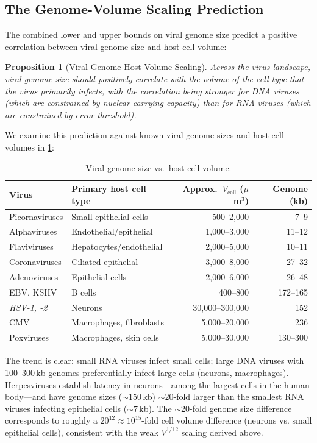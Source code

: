 \documentclass[11pt,twocolumn,a4paper]{article}
\newtheorem{proposition}[theorem]{Proposition}
\theoremstyle{definition}
\theoremstyle{remark}
\begin{document}
\subsection{The Genome-Volume Scaling Prediction}

The combined lower and upper bounds on viral genome size predict a positive correlation between viral genome size and host cell volume:

\begin{proposition}[Viral Genome-Host Volume Scaling]
\label{prop:genome_volume}
Across the virus landscape, viral genome size should positively correlate with the volume of the cell type that the virus primarily infects, with the correlation being stronger for DNA viruses (which are constrained by nuclear carrying capacity) than for RNA viruses (which are constrained by error threshold).
\end{proposition}

We examine this prediction against known viral genome sizes and host cell volumes in \cref{tab:genome_scaling}:

\begin{table}[h]
\centering
\caption{Viral genome size vs.\ host cell volume.}
\label{tab:genome_scaling}
\begin{tabular}{p{3.2cm}lrr}
\toprule
Virus & Primary host cell type & Approx.\ $V_{\mathrm{cell}}$ ($\mu$m$^3$) & Genome (kb) \\
\midrule
Picornaviruses & Small epithelial cells & 500--2,000 & 7--9 \\
Alphaviruses & Endothelial/epithelial & 1,000--3,000 & 11--12 \\
Flaviviruses & Hepatocytes/endothelial & 2,000--5,000 & 10--11 \\
Coronaviruses & Ciliated epithelial & 3,000--8,000 & 27--32 \\
Adenoviruses & Epithelial cells & 2,000--6,000 & 26--48 \\
EBV, KSHV & B cells & 400--800 & 172--165 \\
\textit{HSV-1, -2} & Neurons & 30,000--300,000 & 152 \\
CMV & Macrophages, fibroblasts & 5,000--20,000 & 236 \\
Poxviruses & Macrophages, skin cells & 5,000--30,000 & 130--300 \\
\bottomrule
\end{tabular}
\end{table}

The trend is clear: small RNA viruses infect small cells; large DNA viruses with 100--300\,kb genomes preferentially infect large cells (neurons, macrophages). Herpesviruses establish latency in neurons---among the largest cells in the human body---and have genome sizes ($\sim\!150$\,kb) $\sim\!20$-fold larger than the smallest RNA viruses infecting epithelial cells ($\sim\!7$\,kb). The $\sim\!20$-fold genome size difference corresponds to roughly a $20^{12} \approx 10^{15}$-fold cell volume difference (neurons vs. small epithelial cells), consistent with the weak $V^{1/12}$ scaling derived above.
\end{document}
